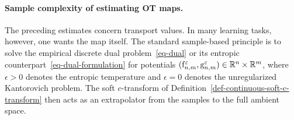 \paragraph{Sample complexity of estimating OT maps.}
The preceding estimates concern transport values. In many learning tasks, however, one wants the map itself. The standard sample-based principle is to solve the empirical discrete dual problem~\eqref{eq-dual} or its entropic counterpart~\eqref{eq-dual-formulation} for potentials \((\mathrm{f}_{n,m}^\varepsilon,\mathrm{g}_{n,m}^\varepsilon)\in\mathbb{R}^n\times\mathbb{R}^m\), where \(\epsilon>0\) denotes the entropic temperature and \(\epsilon=0\) denotes the unregularized Kantorovich problem. The soft \(c\)-transform of Definition~\ref{def-continuous-soft-c-transform} then acts as an extrapolator from the samples to the full ambient space.

